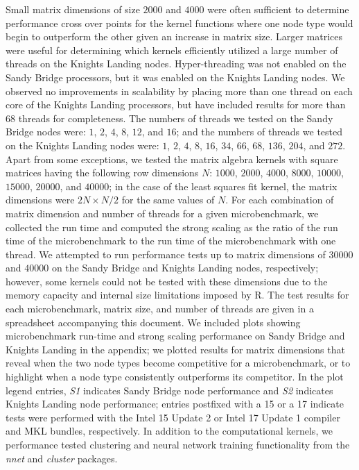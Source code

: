 Small matrix dimensions of size $2000$ and $4000$ were often sufficient to
  determine performance cross over points for the kernel functions where one
  node type would begin to outperform the other given an increase in matrix
  size.
Larger matrices were useful for determining which kernels efficiently utilized a
  large number of threads on the Knights Landing nodes.
Hyper-threading was not enabled on the Sandy Bridge processors, but it was
  enabled on the Knights Landing nodes.
We observed no improvements in scalability by placing more than one thread on
  each core of the Knights Landing processors, but have included results for
  more than 68 threads for completeness.
The numbers of threads we tested on the Sandy Bridge nodes were:
  $1$, $2$, $4$, $8$, $12$, and $16$; and the numbers of threads we tested on
  the Knights Landing nodes were:
  $1$, $2$, $4$, $8$, $16$, $34$, $66$, $68$, $136$, $204$, and $272$.
Apart from some exceptions, we tested the matrix algebra kernels with square
  matrices having the following row dimensions $N$:
  $1000$, $2000$, $4000$, $8000$, $10000$, $15000$, $20000$, and $40000$; in the
  case of the least squares fit kernel, the matrix dimensions were
  $2N \times N/2$ for the same values of $N$.
For each combination of matrix dimension and number of threads for a given
  microbenchmark, we collected the run time and computed the strong scaling as
  the ratio of the run time of the microbenchmark to the run time of the
  microbenchmark with one thread.
We attempted to run performance tests up to matrix dimensions of $30000$ and
  $40000$ on the Sandy Bridge and Knights Landing nodes, respectively; however,
  some kernels could not be tested with these dimensions due to the memory
  capacity and internal size limitations imposed by R.
The test results for each microbenchmark, matrix size, and number of threads are
  given in a spreadsheet accompanying this document.
We included plots showing microbenchmark run-time and strong scaling performance
  on Sandy Bridge and Knights Landing in the appendix; we plotted results for
  matrix dimensions that reveal when the two node types become competitive for
  a microbenchmark, or to highlight when a node type consistently outperforms
  its competitor.
In the plot legend entries, \textit{S1} indicates Sandy Bridge node performance
  and \textit{S2} indicates Knights Landing node performance; entries postfixed
  with a 15 or a 17 indicate tests were performed with the Intel 15 Update 2 or
  Intel 17 Update 1 compiler and MKL bundles, respectively.
In addition to the computational kernels, we performance tested clustering and
  neural network training functionality from the \textit{nnet} and
  \textit{cluster} packages.


